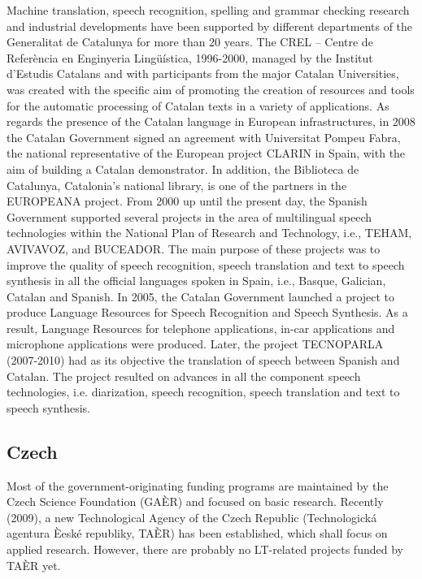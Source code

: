 \documentclass[10pt, plain]{../../metanetpaper}
\begin{document}
\begin{multicols}{2}
\begin{small}
Machine translation, speech recognition, spelling and grammar checking research and industrial developments have been supported by different departments of the Generalitat de Catalunya for more than 20 years. The CREL – Centre de Referència en Enginyeria Lingüística, 1996-2000, managed by the Institut d’Estudis Catalans and with participants from the major Catalan Universities, was created with the specific aim of promoting the creation of resources and tools for the automatic processing of Catalan texts in a variety of applications. As regards the presence of the Catalan language in European infrastructures, in 2008 the Catalan Government signed an agreement with Universitat Pompeu Fabra, the national representative of the European project CLARIN in Spain, with the aim of building a Catalan demonstrator. In addition, the Biblioteca de Catalunya, Catalonia’s national library, is one of the partners in the EUROPEANA project. From 2000 up until the present day, the Spanish Government supported several projects in the area of multilingual speech technologies within the National Plan of Research and Technology, i.e., TEHAM, AVIVAVOZ, and BUCEADOR. The main purpose of these projects was to improve the quality of speech recognition, speech translation and text to speech synthesis in all the official languages spoken in Spain, i.e., Basque, Galician, Catalan and Spanish. In 2005, the Catalan Government launched a project to produce Language Resources for Speech Recognition and Speech Synthesis. As a result, Language Resources for telephone applications, in-car applications and microphone applications were produced. Later, the project TECNOPARLA (2007-2010) had as its objective the translation of speech between Spanish and Catalan. The project resulted on advances in all the component speech technologies, i.e. diarization, speech recognition, speech translation and text to speech synthesis.

%

\subsection*{Czech}
\label{sec:czech}

Most of the government-originating funding programs are maintained by the Czech Science Foundation (GAÈR) and focused on basic research. Recently (2009), a new Technological Agency of the Czech Republic (Technologická agentura Èeské republiky, TAÈR) has been established, which shall focus on applied research. However, there are probably no LT-related projects funded by TAÈR yet. 


\end{small}
\end{multicols}
\end{document}
